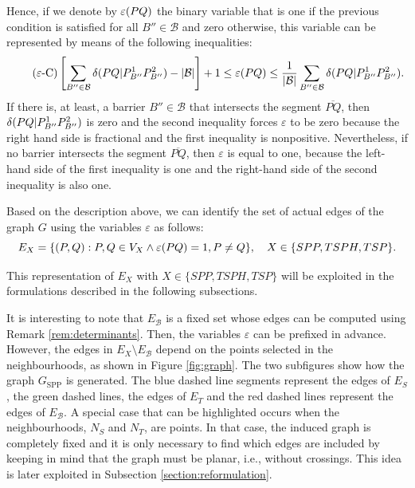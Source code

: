 \documentclass[a4paper,  review, authoryear, 1p., doubleblind]{elsarticle}
\newcommand{\SPPN}{{\sf{H-SPPN}\xspace }}
\newcommand{\B}{{\mathcal B}}
\newcommand{\EB}{{E^{}_{\mathcal B}}}
\newcommand{\ES}{{E^{}_{S}}}
\newcommand{\ET}{{E^{}_{T}}}
\newcommand{\GSPP}{{G_{\text{SPP}}}}
\newcommand{\segment}[2]{\overline{#1#2}}
\begin{document}
	Hence, if we denote by $\varepsilon(PQ)$ the binary variable that is one if the previous condition is satisfied for all $B''\in\B$ and zero otherwise, this variable can be represented by means of the following inequalities:
	\begin{equation*}\tag{$\varepsilon$-C}\label{eq:varepsilonC}
		\left[\sum_{B''\in\mathcal B}\deltacheck{P}{Q}{P^1_{B''}}{P^2_{B''}}-|\mathcal B|\right] + 1\leq \varepsilonvar{P}{Q}\leq \frac{1}{|\B|}\sum_{B''\in\mathcal B}\deltacheck{P}{Q}{P^1_{B''}}{P^2_{B''}}.
	\end{equation*}
	If there is, at least, a barrier $B''\in\B$ that intersects the segment $\overline{PQ}$, then $\delta(PQ|P^1_{B''}P^2_{B''})$ is zero and the second inequality forces $\varepsilon$ to be zero because the right hand side is fractional and the first inequality is nonpositive. Nevertheless, if no barrier intersects the segment $\segment{P}{Q}$, then $\varepsilon$ is equal to one, because the left-hand side of the first inequality is one and the right-hand side of the second inequality is also one. 
	
	Based on the description above, we can identify the set of actual edges of the graph $G$ using the variables $\varepsilon$ as follows:
	$$ E_X = \{(P, Q):P,Q\in V_X\wedge\varepsilon(PQ)=1, P\neq Q\}, \quad X\in \{SPP,TSPH,TSP\}.$$
	
	This representation of $E_X$ with $X\in \{SPP,TSPH,TSP\}$ will be exploited in the formulations described in the following subsections. 
	
	
	It is interesting to note that $\EB$ is a fixed set whose edges can be computed using Remark \ref{rem:determinants}. Then, the variables $\varepsilon$ can be prefixed in advance. However, the edges in $E_X\setminus \EB$ depend on the points selected in the neighbourhoods, as shown in Figure \ref{fig:graph}.  The two subfigures show how the graph $\GSPP$ is generated. The blue dashed line segments represent the edges of $\ES$, the green dashed lines, the edges of $\ET$ and the red dashed lines represent the edges of $\EB$. A special case that can be highlighted occurs when the neighbourhoods, $N_S$ and $N_T$, are points. In that case, the induced graph is completely fixed and it is only necessary to find which edges are included by keeping in mind that the graph must be planar, i.e., without crossings. This idea is later exploited in Subsection \ref{section:reformulation}.
	
	
	
\end{document}
